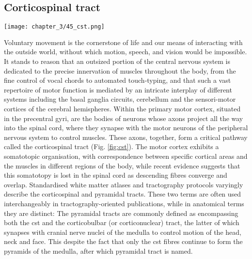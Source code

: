 \subsection{Corticospinal tract}

\begin{SCfigure}[][htb!]
  \texttt{[image: chapter\_3/45\_cst.png]}
  \caption{Schematic reconstruction of the \glspl{cst}, viewed coronally, showing efferent fibres originating in the primary motor cortices converging into a compact bundle in the internal capsule and descending into the spinal cord.}
  \label{fig:cst}
\end{SCfigure}

Voluntary movement is the cornerstone of life and our means of interacting with the outside world, without which motion, speech, and vision would be impossible.
It stands to reason that an outsized portion of the central nervous system is dedicated to the precise innervation of muscles throughout the body, from the fine control of vocal chords to automated touch-typing, and that such a vast repertoire of motor function is mediated by an intricate interplay of different systems including the basal ganglia circuits, cerebellum and the sensori-motor cortices of the cerebral hemispheres.\autocite{Kandel2021}
Within the primary motor cortex, situated in the precentral gyri, are the bodies of neurons whose axons project all the way into the spinal cord, where they synapse with the motor neurons of the peripheral nervous system to control muscles.
These axons, together, form a critical pathway called the corticospinal tract (Fig. \ref{fig:cst}).
The motor cortex exhibits a somatotopic organisation, with correspondence between specific cortical areas and the muscles in different regions of the body, while recent evidence suggests that this somatotopy is lost in the spinal cord as descending fibres converge and overlap\autocite{Lemon2023}.
Standardised white matter atlases and tractography protocols varyingly describe the corticospinal and pyramidal tracts.
These two terms are often used interchangeably in tractography-oriented publications, while in anatomical terms they are distinct:
The pyramidal tracts are commonly defined as encompassing both the \gls{cst} and the corticobulbar (or corticonuclear) tract, the latter of which synapses with cranial nerve nuclei of the medulla to control motion of the head, neck and face.\autocite{Chenot2019}
This despite the fact that only the \gls{cst} fibres continue to form the pyramids of the medulla, after which pyramidal tract is named.
